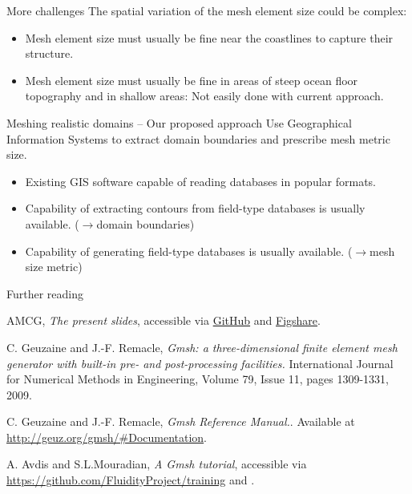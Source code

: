 \documentclass[t]{beamer}
\begin{document}
\begin{frame}{More challenges}
The spatial variation of the mesh element size could be complex:
\begin{itemize}
   \item Mesh element size must usually be fine near the coastlines to capture their structure.\\[15pt]
   \item Mesh element size must usually be fine in areas of steep ocean floor topography and in shallow areas: Not easily done with current approach.
\end{itemize}
\end{frame}

\begin{frame}{Meshing realistic domains -- Our proposed approach}
Use Geographical Information Systems to extract domain boundaries and prescribe mesh metric size.
\begin{itemize}
   \item Existing GIS software capable of reading databases in popular formats.
   \item Capability of extracting contours from field-type databases is usually available. ($\rightarrow$domain boundaries)
   \item Capability of generating field-type databases is usually available. ($\rightarrow$mesh size metric)
\end{itemize}
\end{frame}

\begin{frame}{Further reading}
\begin{thebibliography}{9}

  AMCG, 
  \emph{The present slides},
  accessible via \href{https://github.com/FluidityProject/training}{GitHub} and \href{http://figshare.com/s/0dbd16a2635b11e4a71206ec4b8d1f61}{Figshare}.

  C. Geuzaine and J.-F. Remacle,
  \emph{Gmsh: a three-dimensional finite element mesh generator with built-in pre- and post-processing facilities.}
  International Journal for Numerical Methods in Engineering,
  Volume 79, Issue 11,
  pages 1309-1331, 2009.

  C. Geuzaine and J.-F. Remacle,
  \emph{Gmsh Reference Manual.}.
  Available at
  \url{http://geuz.org/gmsh/\#Documentation}.

  A. Avdis and S.L.Mouradian,
  \emph{A Gmsh tutorial},
  accessible via \href{GitHub}{https://github.com/FluidityProject/training} and \href{Figshare}{}.

  \end{thebibliography}

\end{frame}
\end{document}
